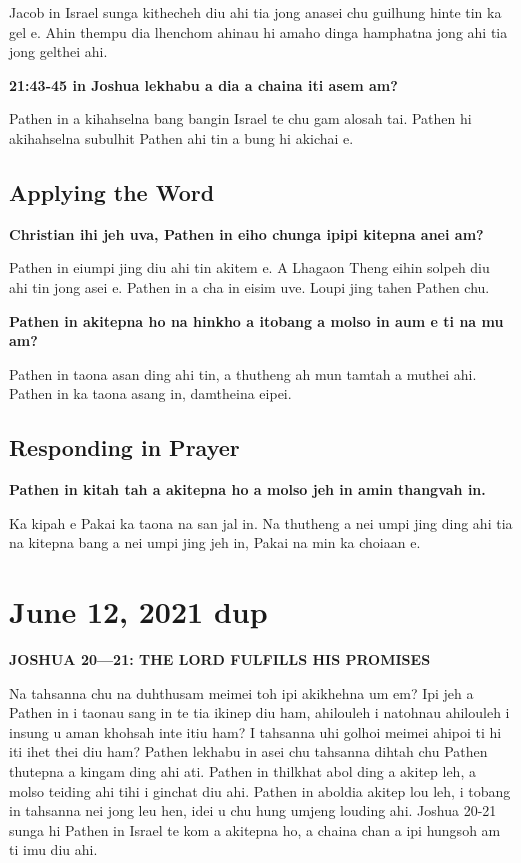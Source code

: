 \documentclass[11pt]{article}
\begin{document}
Jacob in Israel sunga kithecheh diu ahi tia jong anasei chu guilhung
hinte tin ka gel e. Ahin thempu dia lhenchom ahinau hi amaho dinga
hamphatna jong ahi tia jong gelthei ahi.

\textbf{\textbf{21:43-45 in Joshua lekhabu a dia a chaina iti asem am?}}

Pathen in a kihahselna bang bangin Israel te chu gam alosah
 tai. Pathen hi akihahselna subulhit Pathen ahi tin a bung hi akichai
 e.

\subsection{Applying the Word}
\label{sec:orgdeb0c25}

\textbf{\textbf{Christian ihi jeh uva, Pathen in eiho chunga ipipi kitepna anei am?}}

Pathen in eiumpi jing diu ahi tin akitem e. A Lhagaon Theng eihin
solpeh diu ahi tin jong asei e. Pathen in a cha in eisim uve. Loupi
jing tahen Pathen chu.

\textbf{\textbf{Pathen in akitepna ho na hinkho a itobang a molso in aum e ti na mu am?}}

Pathen in taona asan ding ahi tin, a thutheng ah mun tamtah a muthei
ahi. Pathen in ka taona asang in, damtheina eipei.


\subsection{Responding in Prayer}
\label{sec:org15b18d1}

\textbf{\textbf{Pathen in kitah tah a akitepna ho a molso jeh in amin thangvah in.}}

Ka kipah e Pakai ka taona na san jal in. Na thutheng a nei umpi jing
ding ahi tia na kitepna bang a nei umpi jing jeh in, Pakai na min ka
choiaan e.
\section{June 12, 2021 dup}
\label{sec:org22e0cd5}

\textbf{\textbf{JOSHUA 20—21: THE LORD FULFILLS HIS PROMISES}}

Na tahsanna chu na duhthusam meimei toh ipi akikhehna um em? Ipi jeh a
Pathen in i taonau sang in te tia ikinep diu ham, ahilouleh i natohnau
ahilouleh i insung u aman khohsah inte itiu ham? I tahsanna uhi golhoi
meimei ahipoi ti hi iti ihet thei diu ham? Pathen lekhabu in asei chu
tahsanna dihtah chu Pathen thutepna a kingam ding ahi ati. Pathen in
thilkhat abol ding a akitep leh, a molso teiding ahi tihi i ginchat
diu ahi. Pathen in aboldia akitep lou leh, i tobang in tahsanna nei
jong leu hen, idei u chu hung umjeng louding ahi. Joshua 20-21 sunga
hi Pathen in Israel te kom a akitepna ho, a chaina chan a ipi hungsoh
am ti imu diu ahi.
\end{document}
